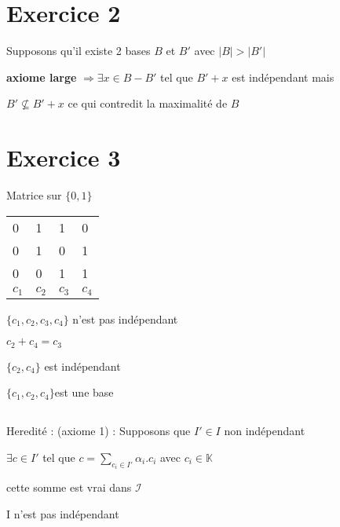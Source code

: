 \documentclass[a4paper]{article}
\begin{document}
\section{Exercice 2}
Supposons qu'il existe 2 bases $B$ et $B'$ avec $|B| > |B'|$

\textbf{axiome large} $\Rightarrow \exists x \in B - B' $ tel que $B' + x$ est indépendant mais

$B' \nsubseteq  B' + x $ ce qui contredit la maximalité de $B$ 
\section{Exercice 3}
Matrice sur $\{0, 1\}$

\begin{tabular}{| l | l | l | l |}
  \hline
  0 & 1 & 1 & 0\\
  0 & 1 & 0 &  1\\
  0 & 0 & 1 & 1\\
  \hline
	  $c_1$ & $c_2$ & $c_3$ & $c_4$ \\
  \hline
\end{tabular}

$\{c_1, c_2, c_3, c_4\}$ n'est pas indépendant

$c_2 + c_4 = c_3$

$\{c_2, c_4\}$ est indépendant

$\{c_1, c_2, c_4\} $est une base

\subsection{}
Heredité : (axiome 1) :
Supposons que $I' \in I$ non indépendant

$\exists c \in I' $ tel que $ c = \sum_{c_i \in I'}^{} \alpha_i.c_i  $ avec $c_i \in \mathbb{K}$	

cette somme est vrai dans $\mathcal{I}$

I n'est pas indépendant
\end{document}
